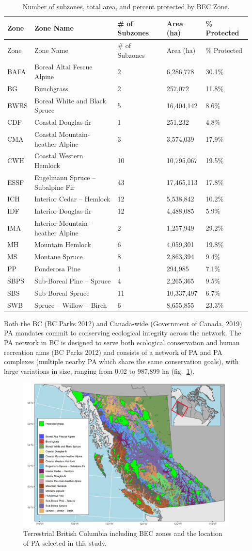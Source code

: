 \documentclass[10pt,oneside]{article}
\makeatletter
\def\maxwidth{\ifdim\Gin@nat@width>\linewidth\linewidth
\else\Gin@nat@width\fi}
\let\Oldincludegraphics\includegraphics
\renewcommand{\includegraphics}[1]{\Oldincludegraphics[width=\maxwidth]{#1}}
\makeatother
\begin{document}
\hypertarget{tbl:bec-table}{}
\begin{longtable}[]{@{}lllll@{}}
\caption{\label{tbl:bec-table}Number of subzones, total area, and
percent protected by BEC Zone.}\tabularnewline
\toprule
Zone & Zone Name & \# of Subzones & Area (ha) & \%
Protected\tabularnewline
\midrule
\endfirsthead
\toprule
Zone & Zone Name & \# of Subzones & Area (ha) & \%
Protected\tabularnewline
\midrule
\endhead
BAFA & Boreal Altai Fescue Alpine & 2 & 6,286,778 &
30.1\%\tabularnewline
BG & Bunchgrass & 2 & 257,072 & 11.8\%\tabularnewline
BWBS & Boreal White and Black Spruce & 5 & 16,404,142 &
8.6\%\tabularnewline
CDF & Coastal Douglas-fir & 1 & 251,232 & 4.8\%\tabularnewline
CMA & Coastal Mountain-heather Alpine & 3 & 3,574,039 &
17.9\%\tabularnewline
CWH & Coastal Western Hemlock & 10 & 10,795,067 & 19.5\%\tabularnewline
ESSF & Engelmann Spruce -- Subalpine Fir & 43 & 17,465,113 &
17.8\%\tabularnewline
ICH & Interior Cedar -- Hemlock & 12 & 5,538,842 & 10.2\%\tabularnewline
IDF & Interior Douglas-fir & 12 & 4,488,085 & 5.9\%\tabularnewline
IMA & Interior Mountain-heather Alpine & 2 & 1,257,949 &
29.2\%\tabularnewline
MH & Mountain Hemlock & 6 & 4,059,301 & 19.8\%\tabularnewline
MS & Montane Spruce & 8 & 2,863,394 & 9.4\%\tabularnewline
PP & Ponderosa Pine & 1 & 294,985 & 7.1\%\tabularnewline
SBPS & Sub-Boreal Pine -- Spruce & 4 & 2,265,365 & 9.5\%\tabularnewline
SBS & Sub-Boreal Spruce & 11 & 10,337,497 & 6.7\%\tabularnewline
SWB & Spruce -- Willow -- Birch & 6 & 8,655,855 & 23.3\%\tabularnewline
\bottomrule
\end{longtable}

Both the BC (BC Parks 2012) and Canada-wide (Government of Canada, 2019)
PA mandates commit to conserving ecological integrity across the
network. The PA network in BC is designed to serve both ecological
conservation and human recreation aims (BC Parks 2012) and consists of a
network of PA and PA complexes (multiple nearby PA which share the same
conservation goals), with large variations in size, ranging from 0.02 to
987,899 ha (fig.~\ref{fig:study-area}).

\begin{figure}
\hypertarget{fig:study-area}{%
\centering
\includegraphics{figures/bec_map.png}
\caption{Terrestrial British Columbia including BEC zones and the
location of PA selected in this study.}\label{fig:study-area}
}
\end{figure}
\end{document}
